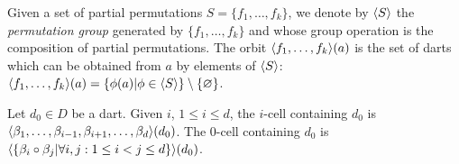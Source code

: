 Given a set of partial permutations $S=\{f_1,\ldots,f_k\}$, we denote
by $\langle{}S\rangle{}$ the \emph{permutation group} generated by
$\{f_1,\ldots,f_k\}$ and whose group operation is the composition of
partial permutations.  The orbit $\langle{}f_1,\ldots,f_k\rangle{}(a)$ is the set
of darts which can be obtained from $a$ by elements of $\langle{}S\rangle{}$:
$\langle{}f_1,\ldots,f_k\rangle{}(a)=\{\phi(a)|\phi \in \langle{}S\rangle{}\}\setminus\{\varnothing\}$.

Let $d_0 \in D$ be a dart. Given $i$, $1\leq i \leq d$,
the $i$-cell containing $d_0$ is 
$\langle{}\beta_1,\ldots,\beta_{i-1},\beta_{i+1},\ldots,\beta_d\rangle{}(d_0)$.
The $0$-cell  containing $d_0$ is 
$\langle{}\{\beta_{i}\circ\beta_{j}|\forall i,j: 1\leq i<j \leq d\}\rangle{}(d_0)$.


